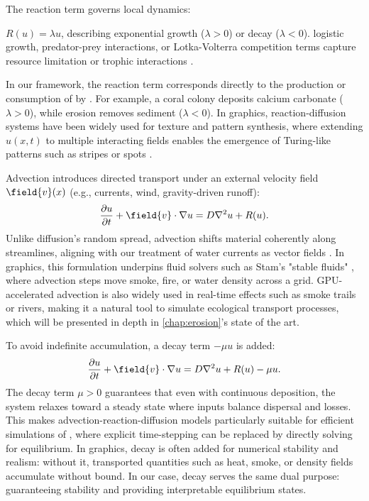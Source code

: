 The reaction term governs local dynamics:
\begin{Itemize}
     $R(u) = \lambda u$, describing exponential growth ($\lambda > 0$) or decay ($\lambda < 0$).
     logistic growth, predator-prey interactions, or Lotka-Volterra competition terms capture resource limitation or trophic interactions \cite{Brauer2012,Verhulst1844}.
\end{Itemize}
In our framework, the reaction term corresponds directly to the production or consumption of  by . For example, a coral colony deposits calcium carbonate ($\lambda > 0$), while erosion removes sediment ($\lambda < 0$).  
In graphics, reaction-diffusion systems have been widely used for texture and pattern synthesis, where extending $u(x,t)$ to multiple interacting fields enables the emergence of Turing-like patterns such as stripes or spots \cite{Turk1991, Witkin1991,Sanderson2006}.

Advection introduces directed transport under an external velocity field $\field{v}(x)$ (e.g., currents, wind, gravity-driven runoff):
\begin{align}
    \label{eq:reaction-diffusion-advection}
    \frac{\partial u}{\partial t} + \field{v}\cdot \nabla u = D \nabla^2 u + R(u).
\end{align}
Unlike diffusion's random spread, advection shifts material coherently along streamlines, aligning with our treatment of water currents as vector fields \cite{Burger2020,Ogden2017}.  
In graphics, this formulation underpins fluid solvers such as Stam's "stable fluids" \cite{Stam1999}, where advection steps move smoke, fire, or water density across a grid. GPU-accelerated advection is also widely used in real-time effects such as smoke trails or rivers, making it a natural tool to simulate ecological transport processes, which will be presented in depth in \cref{chap:erosion}'s state of the art.

To avoid indefinite accumulation, a decay term $-\mu u$ is added:
\begin{align}
    \label{eq:reaction-diffusion-advection-decay}
    \frac{\partial u}{\partial t} + \field{v}\cdot \nabla u = D \nabla^2 u + R(u) - \mu u.
\end{align}
The decay term $\mu > 0$ guarantees that even with continuous deposition, the system relaxes toward a steady state where inputs balance dispersal and losses. This makes advection-reaction-diffusion models particularly suitable for efficient simulations of , where explicit time-stepping can be replaced by directly solving for equilibrium.  
In graphics, decay is often added for numerical stability and realism: without it, transported quantities such as heat, smoke, or density fields accumulate without bound. In our case, decay serves the same dual purpose: guaranteeing stability and providing interpretable equilibrium states.

